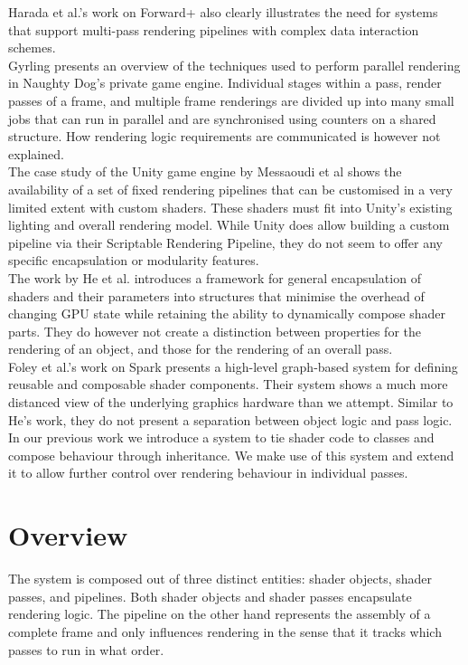 \documentclass[format=sigconf]{acmart}
\begin{document}
Harada et al.'s work on Forward+\cite{forward+}\cite{forward+talk} also clearly illustrates the need for systems that support multi-pass rendering pipelines with complex data interaction schemes. \\

Gyrling\cite{fibers} presents an overview of the techniques used to perform parallel rendering in Naughty Dog's private game engine. Individual stages within a pass, render passes of a frame, and multiple frame renderings are divided up into many small jobs that can run in parallel and are synchronised using counters on a shared structure. How rendering logic requirements are communicated is however not explained. \\

The case study of the Unity game engine by Messaoudi et al\cite{unity} shows the availability of a set of fixed rendering pipelines that can be customised in a very limited extent with custom shaders. These shaders must fit into Unity's existing lighting and overall rendering model. While Unity does allow building a custom pipeline via their Scriptable Rendering Pipeline\cite{unitycustom}, they do not seem to offer any specific encapsulation or modularity features. \\

The work by He et al.\cite{components} introduces a framework for general encapsulation of shaders and their parameters into structures that minimise the overhead of changing GPU state while retaining the ability to dynamically compose shader parts. They do however not create a distinction between properties for the rendering of an object, and those for the rendering of an overall pass. \\

Foley et al.'s work on Spark\cite{spark} presents a high-level graph-based system for defining reusable and composable shader components. Their system shows a much more distanced view of the underlying graphics hardware than we attempt. Similar to He's work, they do not present a separation between object logic and pass logic. \\

In our previous work\cite{glsloop} we introduce a system to tie shader code to classes and compose behaviour through inheritance. We make use of this system and extend it to allow further control over rendering behaviour in individual passes.

\section{Overview}\label{overview}
The system is composed out of three distinct entities: shader objects, shader passes, and pipelines. Both shader objects and shader passes encapsulate rendering logic. The pipeline on the other hand represents the assembly of a complete frame and only influences rendering in the sense that it tracks which passes to run in what order. \\
\end{document}
